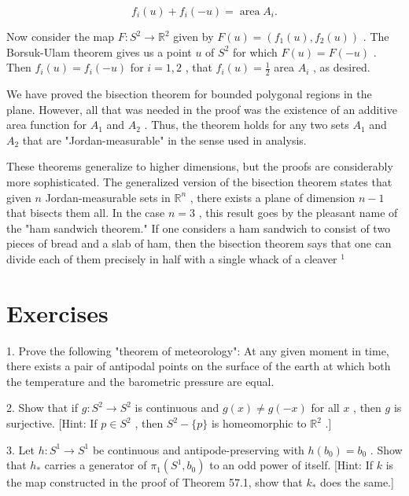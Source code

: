\[
{f}_{i}\left( u\right)  + {f}_{i}\left( {-u}\right)  = \operatorname{area}{A}_{i}.
\]

Now consider the map \(F : {S}^{2} \rightarrow  {\mathbb{R}}^{2}\) given by \(F\left( u\right)  = \left( {{f}_{1}\left( u\right) ,{f}_{2}\left( u\right) }\right)\) . The Borsuk-Ulam theorem gives us a point \(u\) of \({S}^{2}\) for which \(F\left( u\right)  = F\left( {-u}\right)\) . Then \({f}_{i}\left( u\right)  = {f}_{i}\left( {-u}\right)\) for \(i = 1,2\) , that \({f}_{i}\left( u\right)  = \frac{1}{2}\) area \({A}_{i}\) , as desired.

We have proved the bisection theorem for bounded polygonal regions in the plane. However, all that was needed in the proof was the existence of an additive area function for \({A}_{1}\) and \({A}_{2}\) . Thus, the theorem holds for any two sets \({A}_{1}\) and \({A}_{2}\) that are "Jordan-measurable" in the sense used in analysis.

These theorems generalize to higher dimensions, but the proofs are considerably more sophisticated. The generalized version of the bisection theorem states that given \(n\) Jordan-measurable sets in \({\mathbb{R}}^{n}\) , there exists a plane of dimension \(n - 1\) that bisects them all. In the case \(n = 3\) , this result goes by the pleasant name of the "ham sandwich theorem." If one considers a ham sandwich to consist of two pieces of bread and a slab of ham, then the bisection theorem says that one can divide each of them precisely in half with a single whack of a cleaver \({}^{1}\)

\section*{Exercises}

1. Prove the following "theorem of meteorology": At any given moment in time, there exists a pair of antipodal points on the surface of the earth at which both the temperature and the barometric pressure are equal.

2. Show that if \(g : {S}^{2} \rightarrow  {S}^{2}\) is continuous and \(g\left( x\right)  \neq  g\left( {-x}\right)\) for all \(x\) , then \(g\) is surjective. [Hint: If \(p \in  {S}^{2}\) , then \({S}^{2} - \{ p\}\) is homeomorphic to \({\mathbb{R}}^{2}\) .]

3. Let \(h : {S}^{1} \rightarrow  {S}^{1}\) be continuous and antipode-preserving with \(h\left( {b}_{0}\right)  = {b}_{0}\) . Show that \({h}_{ * }\) carries a generator of \({\pi }_{1}\left( {{S}^{1},{b}_{0}}\right)\) to an odd power of itself. [Hint: If \(k\) is the map constructed in the proof of Theorem 57.1, show that \({k}_{ * }\) does the same.]

